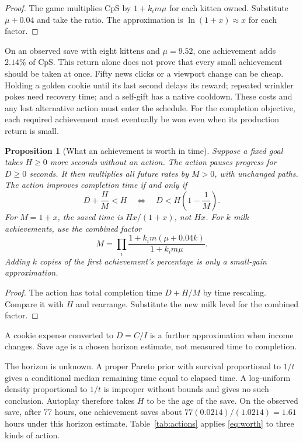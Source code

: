 \documentclass[11pt,a4paper]{article}
\numberwithin{equation}{section}
\newtheorem{proposition}[theorem]{Proposition}
\theoremstyle{definition}
\theoremstyle{remark}
\begin{document}
\begin{proof}
The game multiplies CpS by $1+k_im\mu$ for each kitten owned. Substitute $\mu+0.04$ and take the ratio. The approximation is $\ln(1+x)\approx x$ for each factor.
\end{proof}

On an observed save with eight kittens and $\mu=9.52$, one achievement adds $2.14\%$ of CpS. This return alone does not prove that every small achievement should be taken at once. Fifty news clicks or a viewport change can be cheap. Holding a golden cookie until its last second delays its reward; repeated wrinkler pokes need recovery time; and a self-gift has a native cooldown. These costs and any lost alternative action must enter the schedule. For the completion objective, each required achievement must eventually be won even when its production return is small.

\begin{proposition}[What an achievement is worth in time]\label{prop:worth}
Suppose a fixed goal takes $H\ge0$ more seconds without an action. The action pauses progress for $D\ge0$ seconds. It then multiplies all future rates by $M>0$, with unchanged paths. The action improves completion time if and only if
\begin{equation}\label{eq:worth}
 D+\frac H M<H
 \quad\Longleftrightarrow\quad
 D<H\left(1-\frac1M\right).
\end{equation}
For $M=1+x$, the saved time is $Hx/(1+x)$, not $Hx$. For $k$ milk achievements, use the combined factor
\[
 M=\prod_i\frac{1+k_i m(\mu+0.04k)}{1+k_i m\mu}.
\]
Adding $k$ copies of the first achievement's percentage is only a small-gain approximation.
\end{proposition}
\begin{proof}
The action has total completion time $D+H/M$ by time rescaling. Compare it with $H$ and rearrange. Substitute the new milk level for the combined factor.
\end{proof}

A cookie expense converted to $D=C/I$ is a further approximation when income changes. Save age is a chosen horizon estimate, not measured time to completion.

The horizon is unknown. A proper Pareto prior with survival proportional to $1/t$ gives a conditional median remaining time equal to elapsed time. A log-uniform density proportional to $1/t$ is improper without bounds and gives no such conclusion. Autoplay therefore takes $H$ to be the age of the save. On the observed save, after 77 hours, one achievement saves about $77(0.0214)/(1.0214)=1.61$ hours under this horizon estimate. Table~\ref{tab:actions} applies \eqref{eq:worth} to three kinds of action.
\end{document}
